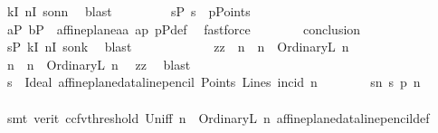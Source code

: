 \begin{isabellebody}
\ kI\ nI\ s{\isacharunderscore}{\kern0pt}on{\isacharunderscore}{\kern0pt}n\ \isamarkupfalse%
\ blast\ \isanewline
\ \ \ \ \ \ \isamarkupfalse%
\ sP{\isacharcolon}{\kern0pt}\ {\isachardoublequoteopen}{\isacharquery}{\kern0pt}s\ {\isasymin}\ pPoints{\isachardoublequoteclose}\ \ \isamarkupfalse%
\ aP\ bP\ \ affine{\isacharunderscore}{\kern0pt}plane{\isachardot}{\kern0pt}a{}a\ ap\ pPdef\ \isamarkupfalse%
\ fastforce\isanewline
\ \ \ \ \ \ \isamarkupfalse%
\ {\isacharquery}{\kern0pt}conclusion\isanewline
\ \ \ \ \ \ \ \ \isamarkupfalse%
\ sP\ kI\ nI\ s{\isacharunderscore}{\kern0pt}on{\isacharunderscore}{\kern0pt}k\ \isamarkupfalse%
\ blast\isanewline
\ \ \ \ \isamarkupfalse%
\isanewline
\ \ \ \ \ \ \isamarkupfalse%
\ zz{\isacharcolon}{\kern0pt}\ {\isachardoublequoteopen}{\isacharparenleft}{\kern0pt}{\isasymexists}\ n{}\ {\isachardot}{\kern0pt}\ n\ {\isacharequal}{\kern0pt}\ OrdinaryL\ n{}{\isacharparenright}{\kern0pt}{\isachardoublequoteclose}\isanewline
\ \ \ \ \ \ \isamarkupfalse%
\ n{}\ \ {\isachardoublequoteopen}n\ {\isacharequal}{\kern0pt}\ OrdinaryL\ n{}{\isachardoublequoteclose}\ \isamarkupfalse%
\ zz\ \isamarkupfalse%
\ blast\isanewline
\ \ \ \ \ \ \isamarkupfalse%
\ {\isacharquery}{\kern0pt}s\ {\isacharequal}{\kern0pt}\ {\isachardoublequoteopen}Ideal\ {\isacharparenleft}{\kern0pt}affine{\isacharunderscore}{\kern0pt}plane{\isacharunderscore}{\kern0pt}data{\isachardot}{\kern0pt}line{\isacharunderscore}{\kern0pt}pencil\ Points\ Lines\ {\isacharparenleft}{\kern0pt}incid{\isacharparenright}{\kern0pt}\ n{}{\isacharparenright}{\kern0pt}{\isachardoublequoteclose}\isanewline
\ \ \ \ \ \ \isamarkupfalse%
\ sn{}{\isacharcolon}{\kern0pt}\ {\isachardoublequoteopen}{\isacharquery}{\kern0pt}s\ p{\isasymlhd}\ n{\isachardoublequoteclose}\ \isanewline
\ \ \ \ \ \ \ \ \isamarkupfalse%
\ {\isacharparenleft}{\kern0pt}smt\ {\isacharparenleft}{\kern0pt}verit{\isacharcomma}{\kern0pt}\ ccfv{\isacharunderscore}{\kern0pt}threshold{\isacharparenright}{\kern0pt}\ Un{\isacharunderscore}{\kern0pt}iff\ {\isacartoucheopen}n\ {\isacharequal}{\kern0pt}\ OrdinaryL\ n{}{\isacartoucheclose}\ affine{\isacharunderscore}{\kern0pt}plane{\isacharunderscore}{\kern0pt}data{\isachardot}{\kern0pt}line{\isacharunderscore}{\kern0pt}pencil{\isacharunderscore}{\kern0pt}def\ \isanewline

\end{isabellebody}
